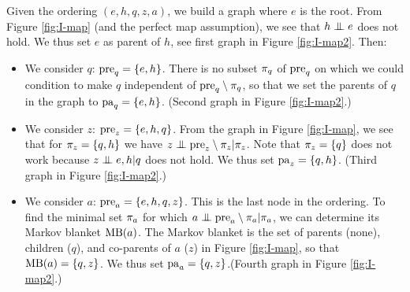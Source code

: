 \begin{exenumerate}
\begin{solution}
    Given the ordering $(e,h,q,z,a)$, we build a graph where $e$ is the
    root. From Figure \ref{fig:I-map} (and the perfect map
    assumption), we see that $h \mathrel{\perp\mspace{-10mu}\perp} e$ does not hold. We
    thus set $e$ as parent of $h$, see first graph in Figure
    \ref{fig:I-map2}. Then:
    \begin{itemize}
      \item We consider $q$: $\mathrm{pre}_q = \{e,h\}$. There is no subset
        $\pi_q$ of $\mathrm{pre}_q$ on which we could condition to make $q$
        independent of $\mathrm{pre}_q \setminus \pi_q$, so that we set the
        parents of $q$ in the graph to $\mathrm{pa}_q = \{e,h\}$. (Second
        graph in Figure \ref{fig:I-map2}.)
      \item We consider $z$: $\mathrm{pre}_z = \{e,h,q\}$. From the graph in
        Figure \ref{fig:I-map}, we see that for $\pi_z = \{q,h\}$ we
        have $z \mathrel{\perp\mspace{-10mu}\perp} \mathrm{pre}_z \setminus \pi_z | \pi_z$. Note
        that $\pi_z = \{q\}$ does not work because $z \mathrel{\perp\mspace{-10mu}\perp}
        e,h | q$ does not hold. We thus set $\mathrm{pa}_z =\{q,h\}$. (Third
        graph in Figure \ref{fig:I-map2}.)
      \item We consider $a$: $\mathrm{pre}_a = \{e,h,q,z\}$. This is the last
        node in the ordering. To find the minimal set $\pi_a$ for
        which $a \mathrel{\perp\mspace{-10mu}\perp} \mathrm{pre}_a \setminus \pi_a | \pi_a$, we
        can determine its Markov blanket $\textrm{MB}(a)$. The Markov blanket
        is the set of parents (none), children ($q$), and co-parents
        of $a$ ($z$) in Figure \ref{fig:I-map}, so that $\textrm{MB}(a) = \{q,z\}$. We
        thus set $\mathrm{pa}_a = \{q,z\}$.(Fourth graph in Figure
        \ref{fig:I-map2}.)
\end{itemize}
    \begin{figure}[h]
      \centering
      \hspace{1ex}
\end{figure}
\end{solution}
\end{exenumerate}
